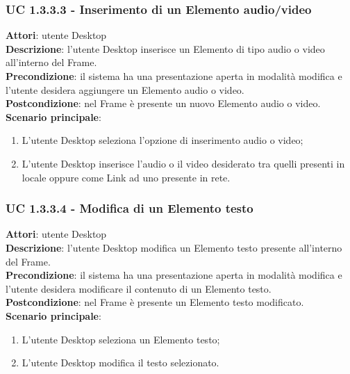 \subsubsection{UC 1.3.3.3 - Inserimento di un Elemento audio/video}{
	\label{uc1.3.3.3}
	\textbf{Attori}: utente Desktop \\
	\textbf{Descrizione}: l'utente Desktop inserisce un Elemento di tipo audio o video all'interno del Frame. \\
	\textbf{Precondizione}: il sistema ha una presentazione aperta in modalità modifica e l'utente desidera aggiungere un Elemento audio o video.	\\
	\textbf{Postcondizione}: nel Frame è presente un nuovo Elemento audio o video.	\\
	\textbf{Scenario principale}:
	\begin{enumerate}
		\item L'utente Desktop seleziona l'opzione di inserimento audio o video;
		\item L'utente Desktop inserisce l'audio o il video desiderato tra quelli presenti in locale oppure come Link ad uno presente in rete.
	\end{enumerate}
	}
\subsubsection{UC 1.3.3.4 - Modifica di un Elemento testo}{
	\label{uc1.3.3.4}
	\textbf{Attori}: utente Desktop \\
	\textbf{Descrizione}: l'utente Desktop modifica un Elemento testo presente all'interno del Frame. \\
	\textbf{Precondizione}: il sistema ha una presentazione aperta in modalità modifica e l'utente desidera modificare il contenuto di un Elemento testo.	\\
	\textbf{Postcondizione}: nel Frame è presente un Elemento testo modificato.	\\
	\textbf{Scenario principale}:
	\begin{enumerate}
		\item L'utente Desktop seleziona un Elemento testo;
		\item L'utente Desktop modifica il testo selezionato.
	\end{enumerate}
	}
